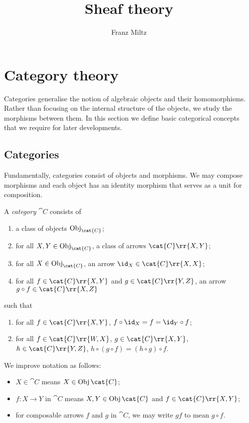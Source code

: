 \documentclass{article}
\author{Franz Miltz}
\title{Sheaf theory}
\begin{document}
\maketitle
\tableofcontents
\pagebreak

\section{Category theory}\label{sec:categories_and_functors}

Categories generalise the notion of algebraic objects and their homomorphisms.
Rather than focusing on the internal structure of the objects, we study the
morphisms between them. In this section we define basic categorical concepts that
we require for later developments.

\subsection{Categories}

Fundamentally, categories consist of objects and morphisms. We may compose morphisms
and each object has an identity morphism that serves as a unit for composition.

\begin{definition}\label{def:category}
  A \emph{category} $\cat C$ consists of
  \begin{enumerate}
    \item a class of objects $\Obj_{\cat{C}}$;
    \item for all $X,Y\in\Obj_{\cat{C}}$, a class of arrows $\cat{C}\rr{X,Y}$;
    \item for all $X\in\Obj_{\cat{C}}$, an arrow $\id_X\in\cat{C}\rr{X,X}$;
    \item for all $f\in\cat{C}\rr{X,Y}$ and $g\in\cat{C}\rr{Y,Z}$, an arrow
      $g\circ f\in\cat{C}\rr{X,Z}$
  \end{enumerate}
  such that
  \begin{enumerate}
    \item for all $f\in\cat{C}\rr{X,Y}$, $f\circ \id_X = f = \id_Y\circ f$;
    \item for all $f\in\cat{C}\rr{W,X}$, $g\in\cat{C}\rr{X,Y}$, $h\in\cat{C}\rr{Y,Z}$,
      $h\circ(g\circ f)=(h\circ g)\circ f$.
  \end{enumerate}
\end{definition}

\begin{notation}
  We improve notation as follows:
  \begin{itemize}
    \item $X\in\cat{C}$ means $X\in\Obj\cat{C}$;
    \item $f:X\to Y$ in $\cat{C}$ means $X,Y\in\Obj\cat{C}$ and $f\in\cat{C}\rr{X,Y}$;
    \item for composable arrows $f$ and $g$ in $\cat{C}$, we may write $gf$ to mean $g\circ f$.
  \end{itemize}
\end{notation}
\end{document}
